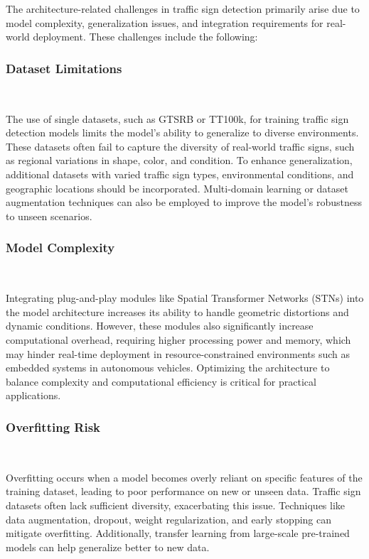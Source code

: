 \documentclass[letterpaper, 10 pt, conference]{ieeeconf}
\begin{document}
The architecture-related challenges in traffic sign detection primarily arise due to model complexity, generalization issues, and integration requirements for real-world deployment. These challenges include the following:

\subsubsection{Dataset Limitations}\

The use of single datasets, such as GTSRB or TT100k, for training traffic sign detection models limits the model's ability to generalize to diverse environments. These datasets often fail to capture the diversity of real-world traffic signs, such as regional variations in shape, color, and condition. To enhance generalization, additional datasets with varied traffic sign types, environmental conditions, and geographic locations should be incorporated. Multi-domain learning or dataset augmentation techniques can also be employed to improve the model's robustness to unseen scenarios.

\subsubsection{Model Complexity}\

Integrating plug-and-play modules like Spatial Transformer Networks (STNs) into the model architecture increases its ability to handle geometric distortions and dynamic conditions. However, these modules also significantly increase computational overhead, requiring higher processing power and memory, which may hinder real-time deployment in resource-constrained environments such as embedded systems in autonomous vehicles. Optimizing the architecture to balance complexity and computational efficiency is critical for practical applications.

\subsubsection{Overfitting Risk}\

Overfitting occurs when a model becomes overly reliant on specific features of the training dataset, leading to poor performance on new or unseen data. Traffic sign datasets often lack sufficient diversity, exacerbating this issue. Techniques like data augmentation, dropout, weight regularization, and early stopping can mitigate overfitting. Additionally, transfer learning from large-scale pre-trained models can help generalize better to new data.
\end{document}
